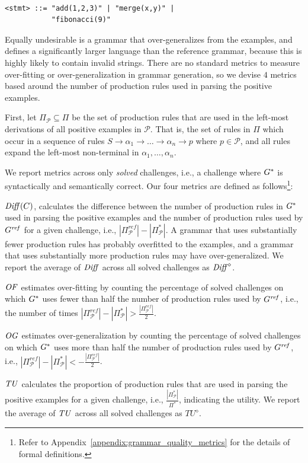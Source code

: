 \vspace{1em}
\begin{minipage}{0.92\linewidth}
\begin{verbatim}

<stmt> ::= "add(1,2,3)" | "merge(x,y)" |
           "fibonacci(9)"
\end{verbatim}
\end{minipage}
\vspace{1em}


Equally undesirable is a grammar that over-generalizes from the examples, and defines a significantly larger language than the reference grammar, because this is highly likely to contain invalid strings. 
%
There are no standard metrics to measure over-fitting or over-generalization in grammar generation, so we devise $4$ metrics based around the number of production rules used in parsing the positive examples. 

First, let $\Pi_\mathcal{P} \subseteq \Pi$ be the set of production rules that are used in the left-most derivations of all positive examples in $\mathcal{P}$. That is, the set of rules in $\Pi$ which occur in a sequence of rules $S \rightarrow \alpha_1 \rightarrow \ldots \rightarrow \alpha_n \rightarrow  p $ where $p \in \mathcal{P}$, and all rules expand the left-most non-terminal in $\alpha_1, \ldots, \alpha_n$. 

We report metrics across only \emph{solved} challenges, i.e., a challenge where $G^*$ is syntactically and semantically correct. Our four metrics are defined as follows\footnote{Refer to Appendix~\ref{appendix:grammar_quality_metrics} for the details of formal definitions.}:
\begin{squishitem}
    \item ${\mathit{Diff}}(C)$, calculates the difference between the number of production rules in $G^*$ used in parsing the positive examples and the number of production rules used by $G^{\mathit{ref}}$ for a given challenge, i.e., $|\Pi^{ref}_\mathcal{P}| - |\Pi^*_\mathcal{P}|$. A grammar that uses substantially fewer production rules has probably overfitted to the examples, and a grammar that uses substantially more production rules may have over-generalized. We report the average of ${\mathit{Diff}}$ across all solved challenges as ${\mathit{Diff}}^\diamond$.
    \item $\mathit{OF}$ estimates over-fitting by counting the percentage of solved challenges on which $G^*$ uses fewer than half the number of production rules used by $G^{\mathit{ref}}$, i.e., the number of times $|\Pi^{ref}_\mathcal{P}| - |\Pi^*_\mathcal{P}| > \frac{|\Pi^{ref}_\mathcal{P}|}{2}$. 
    \item $\mathit{OG}$ estimates over-generalization by counting the percentage of solved challenges on which $G^*$ uses more than half the number of production rules used by $G^{\mathit{ref}}$, i.e.,  $|\Pi^{ref}_\mathcal{P}| - |\Pi^*_\mathcal{P}| < -\frac{|\Pi^{ref}_\mathcal{P}|}{2}$.
    \item $\mathit{TU}$ calculates the proportion of production rules that are used in parsing the positive examples for a given challenge, i.e., $\frac{|\Pi^*_\mathcal{P}|}{\Pi^*}$, indicating the utility. We report the average of $\mathit{TU}$ across all solved challenges as $TU^\diamond$.
\end{squishitem} 

